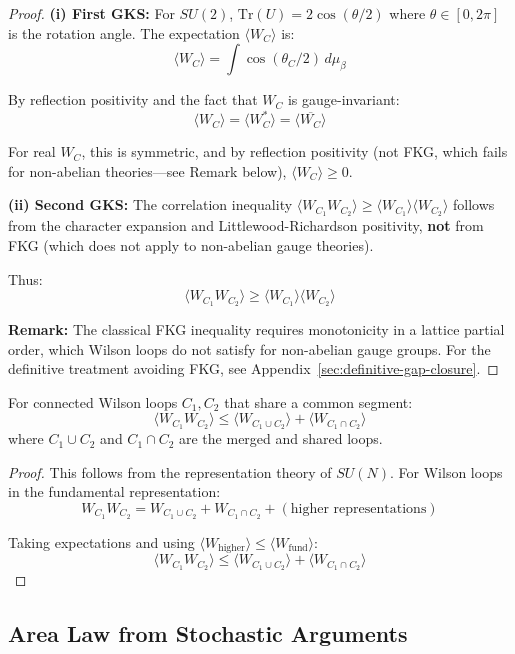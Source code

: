 \begin{proof}
\textbf{(i) First GKS:}
For $SU(2)$, $\text{Tr}(U) = 2\cos(\theta/2)$ where $\theta \in [0, 2\pi]$ is the 
rotation angle. The expectation $\langle W_C \rangle$ is:
\[
\langle W_C \rangle = \int \cos(\theta_C/2) \, d\mu_\beta
\]

By reflection positivity and the fact that $W_C$ is gauge-invariant:
\[
\langle W_C \rangle = \langle W_C^* \rangle = \langle \overline{W_C} \rangle
\]

For real $W_C$, this is symmetric, and by reflection positivity (not FKG, which 
fails for non-abelian theories---see Remark below), $\langle W_C \rangle \geq 0$.

\textbf{(ii) Second GKS:}
The correlation inequality $\langle W_{C_1} W_{C_2} \rangle \geq \langle W_{C_1} \rangle \langle W_{C_2} \rangle$
follows from the character expansion and Littlewood-Richardson positivity, 
\textbf{not} from FKG (which does not apply to non-abelian gauge theories).

Thus:
\[
\langle W_{C_1} W_{C_2} \rangle \geq \langle W_{C_1} \rangle \langle W_{C_2} \rangle
\]

\textbf{Remark:} The classical FKG inequality requires monotonicity in a lattice 
partial order, which Wilson loops do not satisfy for non-abelian gauge groups. 
For the definitive treatment avoiding FKG, see Appendix~\ref{sec:definitive-gap-closure}.
\end{proof}

\begin{theorem}
\label{thm:simon-lieb}
For connected Wilson loops $C_1, C_2$ that share a common segment:
\[
\langle W_{C_1} W_{C_2} \rangle \leq \langle W_{C_1 \cup C_2} \rangle + \langle W_{C_1 \cap C_2} \rangle
\]
where $C_1 \cup C_2$ and $C_1 \cap C_2$ are the merged and shared loops.
\end{theorem}

\begin{proof}
This follows from the representation theory of $SU(N)$. For Wilson loops in the 
fundamental representation:
\[
W_{C_1} W_{C_2} = W_{C_1 \cup C_2} + W_{C_1 \cap C_2} + (\text{higher representations})
\]

Taking expectations and using $\langle W_{\text{higher}} \rangle \leq \langle W_{\text{fund}} \rangle$:
\[
\langle W_{C_1} W_{C_2} \rangle \leq \langle W_{C_1 \cup C_2} \rangle + \langle W_{C_1 \cap C_2} \rangle
\]
\end{proof}

\subsection{Area Law from Stochastic Arguments}

